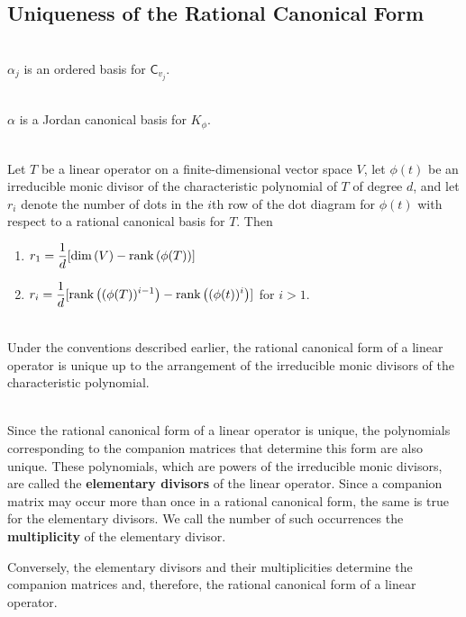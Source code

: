 \subsection*{Uniqueness of the Rational Canonical Form}

\begin{lemma}
	\hfill\\
	$\alpha_j$ is an ordered basis for $\mathsf{C}_{v_j}$.
\end{lemma}

\begin{lemma}
	\hfill\\
	$\alpha$ is a Jordan canonical basis for $K_\phi$.
\end{lemma}

\begin{theorem}
	\hfill\\
	Let $T$ be a linear operator on a finite-dimensional vector space $V$, let $\phi(t)$ be an irreducible monic divisor of the characteristic polynomial of $T$ of degree $d$, and let $r_i$ denote the number of dots in the $i$th row of the dot diagram for $\phi(t)$ with respect to a rational canonical basis for $T$. Then

	\begin{enumerate}
		\item $r_1 = \displaystyle\frac{1}{d}[\text{dim}\left(V\right)-\text{rank}\left(\phi(T)\right)]$
		\item $r_i = \displaystyle\frac{1}{d}[\text{rank}\left((\phi(T))^{i-1}\right) - \text{rank}\left((\phi(t))^i\right)]$ for $i > 1$.
	\end{enumerate}
\end{theorem}

\begin{corollary}
	\hfill\\
	Under the conventions described earlier, the rational canonical form of a linear operator is unique up to the arrangement of the irreducible monic divisors of the characteristic polynomial.
\end{corollary}

\begin{definition}
	\hfill\\
	Since the rational canonical form of a linear operator is unique, the polynomials corresponding to the companion matrices that determine this form are also unique. These polynomials, which are powers of the irreducible monic divisors, are called the \textbf{elementary divisors} of the linear operator. Since a companion matrix may occur more than once in a rational canonical form, the same is true for the elementary divisors. We call the number of such occurrences the \textbf{multiplicity} of the elementary divisor.

	Conversely, the elementary divisors and their multiplicities determine the companion matrices and, therefore, the rational canonical form of a linear operator.
\end{definition}

